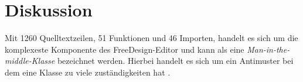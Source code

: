 \chapter{Diskussion}




Mit  1260 Quelltextzeilen, 51 Funktionen und 46 Importen, handelt es sich um die komplexeste Komponente des FreeDesign-Editor und kann als eine \emph{Man-in-the-middle-Klasse} bezeichnet werden. Hierbei handelt es sich um ein Antimuster bei dem eine Klasse zu viele zuständigkeiten hat \autocite[vgl.][619]{Geirhos2015}.

%


